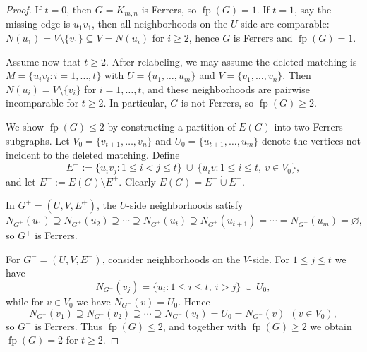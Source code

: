 \documentclass[10pt,a4paper]{amsart}
\newcommand{\fp}{\operatorname{fp}}
\begin{document}
\begin{proof}
If $t=0$, then $G=K_{m,n}$ is Ferrers, so $\fp(G)=1$.
If $t=1$, say the missing edge is $u_1v_1$, then all neighborhoods on the $U$-side are comparable:
$N(u_1)=V\setminus\{v_1\}\subseteq V=N(u_i)$ for $i\ge 2$, hence $G$ is Ferrers and $\fp(G)=1$.

Assume now that $t\ge 2$.
After relabeling, we may assume the deleted matching is
$M=\{u_iv_i: i=1,\dots,t\}$ with $U=\{u_1,\dots,u_m\}$ and $V=\{v_1,\dots,v_n\}$.
Then $N(u_i)=V\setminus\{v_i\}$ for $i=1,\dots,t$, and these neighborhoods are pairwise incomparable for $t\ge 2$.
In particular, $G$ is not Ferrers, so $\fp(G)\ge 2$.

We show $\fp(G)\le 2$ by constructing a partition of $E(G)$ into two Ferrers subgraphs.
Let $V_0=\{v_{t+1},\dots,v_n\}$ and $U_0=\{u_{t+1},\dots,u_m\}$ denote the vertices not incident to the deleted matching.
Define
\[
E^+ := \{u_i v_j : 1\le i<j\le t\}\ \cup\ \{u_i v : 1\le i\le t,\ v\in V_0\},
\]
and let $E^-:=E(G)\setminus E^+$.
Clearly $E(G)=E^+\dot\cup E^-$.

In $G^+=(U,V,E^+)$, the $U$-side neighborhoods satisfy
\[
N_{G^+}(u_1)\supseteq N_{G^+}(u_2)\supseteq\cdots\supseteq N_{G^+}(u_t)\supseteq
N_{G^+}(u_{t+1})=\cdots=N_{G^+}(u_m)=\varnothing,
\]
so $G^+$ is Ferrers.

For $G^-=(U,V,E^-)$, consider neighborhoods on the $V$-side.
For $1\le j\le t$ we have
\[
N_{G^-}(v_j)=\{u_i: 1\le i\le t,\ i>j\}\ \cup\ U_0,
\]
while for $v\in V_0$ we have $N_{G^-}(v)=U_0$.
Hence
\[
N_{G^-}(v_1)\supseteq N_{G^-}(v_2)\supseteq\cdots\supseteq N_{G^-}(v_t)=U_0
= N_{G^-}(v)\ \ (v\in V_0),
\]
so $G^-$ is Ferrers.
Thus $\fp(G)\le 2$, and together with $\fp(G)\ge 2$ we obtain $\fp(G)=2$ for $t\ge 2$.
\end{proof}
\end{document}
